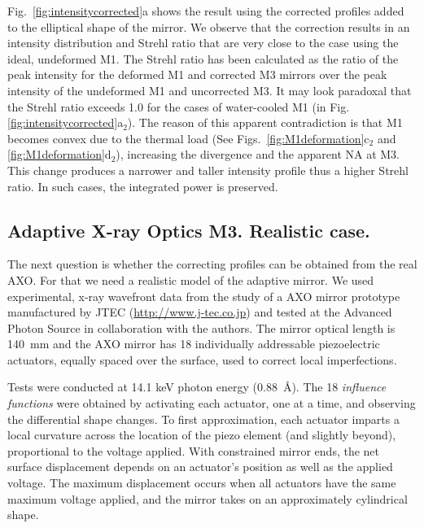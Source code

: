 \documentclass{iucr}
\newcommand{\inblue}[1]{{\color{black}#1}}
\begin{document}
Fig.~\ref{fig:intensitycorrected}a shows the result using the corrected profiles added to the elliptical shape of the mirror. We observe that the correction results in an intensity distribution and Strehl ratio that are very close to the case using the ideal, undeformed M1. The Strehl ratio has been calculated as the ratio of the peak intensity for the deformed M1 and corrected M3 mirrors over the peak intensity of the undeformed M1 and uncorrected M3. It may look paradoxal that the Strehl ratio exceeds 1.0 for the cases of water-cooled M1 (in Fig.\ref{fig:intensitycorrected}a$_2$). The reason of this apparent contradiction is that M1 becomes convex due to the thermal load (See Figs.~\ref{fig:M1deformation}c$_2$ and \ref{fig:M1deformation}d$_2$), increasing the divergence and the apparent NA at M3. This change produces a narrower and taller intensity profile thus a higher Strehl ratio.
In such cases, the integrated power is preserved.

\subsection{Adaptive X-ray Optics M3. Realistic case.}

The next question is whether the correcting profiles can be obtained from the real AXO. For that we need a realistic model of the adaptive mirror. We used experimental, x-ray wavefront data from the study of a AXO mirror prototype manufactured by JTEC (\url{http://www.j-tec.co.jp}) and tested at the Advanced Photon Source in collaboration with the authors. The mirror optical length is 140~mm and the AXO mirror has 18  individually addressable piezoelectric actuators, equally spaced over the surface, used to correct local imperfections.


Tests were conducted at 14.1 keV photon energy (0.88~\AA). The 18 \emph{influence functions} were obtained by activating each actuator, one at a time, and observing the differential shape changes. To first approximation, each actuator imparts a local curvature 
\inblue{across the location of the piezo element (and slightly beyond), proportional to the voltage applied. With constrained mirror ends, the net surface displacement depends on an actuator's position as well as the applied voltage. The maximum displacement occurs when all actuators have the same maximum voltage applied, and the mirror takes on an approximately cylindrical shape.}
\end{document}
